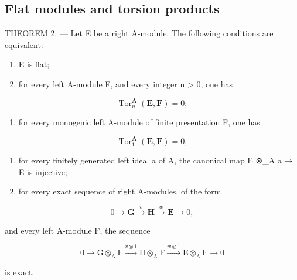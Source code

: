 \subsection{Flat modules and torsion products}

THEOREM 2. --- Let E be a right A-module. The following conditions are equivalent:

\begin{enumerate}
\def\labelenumi{(\roman{enumi})}
\item
  E is flat;
\item
  for every left A-module F, and every integer n \textgreater{} 0, one has
\end{enumerate}

\[
\operatorname{Tor} _ {n} ^ {\mathbf {A}} (\mathbf {E}, \mathbf {F}) = 0;
\]

\begin{enumerate}
\def\labelenumi{(\roman{enumi})}
\setcounter{enumi}{2}
\tightlist
\item
  for every monogenic left A-module of finite presentation F, one has
\end{enumerate}

\[
\operatorname{Tor} _ {1} ^ {\mathbf {A}} (\mathbf {E}, \mathbf {F}) = 0;
\]

\begin{enumerate}
\def\labelenumi{(\roman{enumi})}
\setcounter{enumi}{3}
\item
  for every finitely generated left ideal a of A, the canonical map E ⊗\_A a → E is injective;
\item
  for every exact sequence of right A-modules, of the form
\end{enumerate}

\[
0 \rightarrow \mathbf {G} \xrightarrow {v} \mathbf {H} \xrightarrow {w} \mathbf {E} \rightarrow 0,
\]

and every left A-module F, the sequence

\[
0 \longrightarrow \mathrm{G} \otimes_ {\mathrm{A}} \mathrm{F} \xrightarrow {v \otimes 1} \mathrm{H} \otimes_ {\mathrm{A}} \mathrm{F} \xrightarrow {w \otimes 1} \mathrm{E} \otimes_ {\mathrm{A}} \mathrm{F} \longrightarrow 0
\]

is exact.

